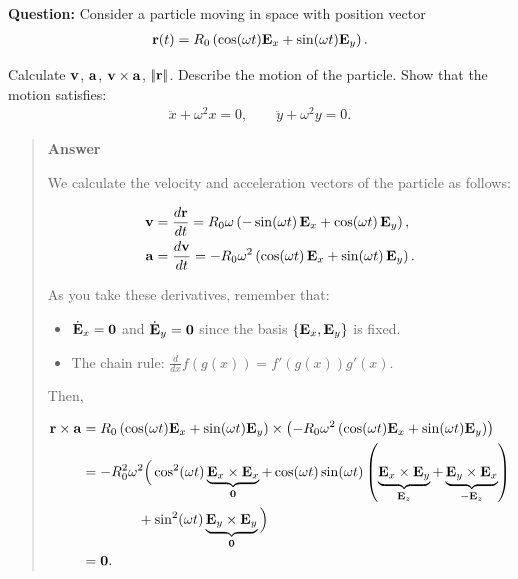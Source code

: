 \documentclass[
  letterpaper,
  DIV=11,
  numbers=noendperiod]{scrreprt}
\providecommand{\tightlist}{%
  \setlength{\itemsep}{0pt}\setlength{\parskip}{0pt}}
\newcommand{\lnorm}{\left|\!\left|}
\newcommand{\rnorm}{\right|\!\right|}
\newcommand{\lp}{\left(}
\newcommand{\rp}{\right)}
\begin{document}
\begin{tcolorbox}[enhanced jigsaw, arc=.35mm, bottomrule=.15mm, bottomtitle=1mm, breakable, colback=white, colbacktitle=quarto-callout-warning-color!10!white, colframe=quarto-callout-warning-color-frame, coltitle=black, left=2mm, leftrule=.75mm, opacityback=0, opacitybacktitle=0.6, rightrule=.15mm, title=\textcolor{quarto-callout-warning-color}{\faExclamationTriangle}\hspace{0.5em}{Example}, titlerule=0mm, toprule=.15mm, toptitle=1mm]

\textbf{Question:} Consider a particle moving in space with position
vector \begin{align}
    {\bf r}(t) = R_0\lp\cos(\omega t){\bf E}_x+\sin(\omega t){\bf E}_y\rp.
\end{align}

Calculate \({\bf v}\), \({\bf a}\), \({\bf v}\times {\bf a}\),
\(\lnorm{\bf r}\rnorm\). Describe the motion of the particle. Show that
the motion satisfies: \begin{align}
    \ddot{x}+\omega^2 x=0, \qquad \ddot{y}+\omega^2 y=0.
\end{align}

\begin{quote}
\textbf{Answer}

We calculate the velocity and acceleration vectors of the particle as
follows:

\begin{align*}
{\bf v} &= \frac{d{\bf r}}{dt}
= R_0\omega\left(-\sin(\omega t)\,{\bf E}_x+\cos(\omega t)\,{\bf E}_y\right),\\
{\bf a} &= \frac{d{\bf v}}{dt}
= -R_0\omega^2\left(\cos(\omega t)\,{\bf E}_x+\sin(\omega t)\,{\bf E}_y\right).
\end{align*}

As you take these derivatives, remember that:

\begin{itemize}
\tightlist
\item
  \(\dot{\bf E}_x={\bf 0}\) and \(\dot{\bf E}_y={\bf 0}\) since the
  basis \(\{{\bf E}_x,{\bf E}_y\}\) is fixed.
\item
  The chain rule: \(\frac{d}{dx}f(g(x)) = f'(g(x))g'(x).\)
\end{itemize}

Then,

\begin{align*}
{\bf r}\times{\bf a}
&=
R_0\left(\cos(\omega t){\bf E}_x+\sin(\omega t){\bf E}_y\right)
\times
\left(
-R_0\omega^2\left(\cos(\omega t){\bf E}_x+\sin(\omega t){\bf E}_y\right)
\right) \\
&=
-R_0^2\omega^2
\Big(
\cos^2(\omega t)\underbrace{{\bf E}_x\times{\bf E}_x}_{{\bf 0}}
+\cos(\omega t)\sin(\omega t)
\left(
\underbrace{{\bf E}_x\times{\bf E}_y}_{{\bf E}_z}
+
\underbrace{{\bf E}_y\times{\bf E}_x}_{-{\bf E}_z}
\right) \\
&\qquad\qquad
+\sin^2(\omega t)\underbrace{{\bf E}_y\times{\bf E}_y}_{{\bf 0}}
\Big) \\
&= {\bf 0}.
\end{align*}


\end{quote}
\end{tcolorbox}
\end{document}
